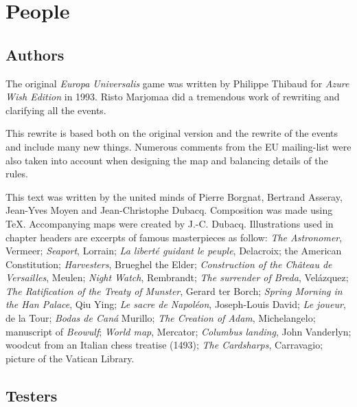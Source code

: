 

\chapter*{People}

\section*{Authors}

The original \emph{Europa Universalis} game was written by Philippe Thibaud
for \emph{Azure Wish Edition} in 1993. Risto Marjomaa did a tremendous work of
rewriting and clarifying all the events.

This rewrite is based both on the original version and the rewrite of the
events and include many new things. Numerous comments from the EU mailing-list
were also taken into account when designing the map and balancing details of
the rules.

This text was written by the united minds of Pierre Borgnat, Bertrand Asseray,
Jean-Yves Moyen and Jean-Christophe Dubacq. Composition was made using
\TeX. Accompanying maps were created by J.-C. Dubacq. Illustrations used in
chapter headers are excerpts of famous masterpieces as follow:
 \emph{The Astronomer}, Vermeer;
\emph{Seaport}, Lorrain;
\emph{La liberté guidant le peuple}, Delacroix;
the American Constitution;
\emph{Harvesters}, Brueghel the Elder;
\emph{Construction of the Château de Versailles}, Meulen;
\emph{Night Watch}, Rembrandt;
\emph{The surrender of Breda}, Velázquez;
\emph{The Ratification of the Treaty of Munster}, Gerard ter Borch;
\emph{Spring Morning in the Han Palace}, Qiu Ying;
\emph{Le sacre de Napoléon}, Joseph-Louis David;
\emph{Le joueur}, de la Tour;
\emph{Bodas de Caná} Murillo;
\emph{The Creation of Adam}, Michelangelo;
manuscript of \emph{Beowulf};
\emph{World map}, Mercator;
\emph{Columbus landing}, John Vanderlyn; 
woodcut from an Italian chess treatise (1493);
\emph{The Cardsharps}, Carravagio;
picture of the Vatican Library.




\section*{Testers}

